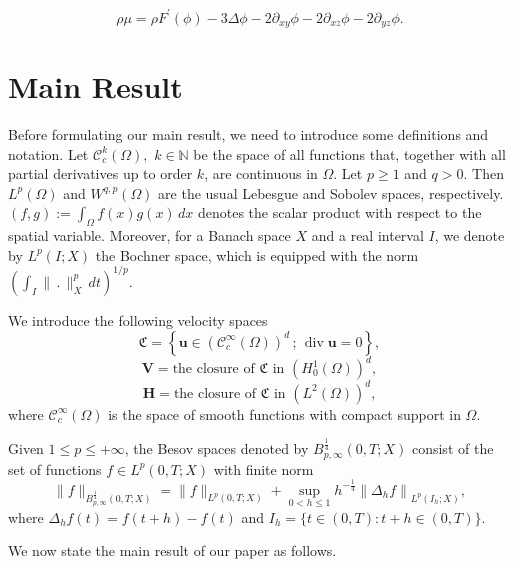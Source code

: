 \documentclass[11pt]{article}
\def\bq{\begin{equation}}
\def\eq{\end{equation}}
\def\bq{\begin{equation}}
\def\eq{\end{equation}}
\begin{document}
\bq\rho\mu = \rho F^{\prime}(\phi) - 3 \Delta \phi - 2 \partial_{xy}\phi - 2 \partial_{xz}\phi - 2 
\partial_{yz}\phi.\eq
















\section{Main Result}
Before formulating our main result, we need to introduce some definitions and notation. Let $\mathcal{C}_c^{k}(\Omega),\,\, k\in \mathbb{N}$ be the space of all functions that, together with all partial derivatives up to order $k$, are continuous in $\Omega$. Let $p \geq 1$ and $q > 0$. Then $L^p (\Omega)$ and $W^{q,p} (\Omega)$ are the usual Lebesgue and Sobolev spaces, respectively. $(f, g):= \int_{\Omega} f(x) g(x) \, dx$ denotes the scalar product with respect to the spatial variable. Moreover, for a Banach space $X$ and a real interval $I$, we
denote by $L^p(I; X)$ the Bochner space, which is equipped with the norm $\left(\int_I \|\,.\,\|_X^p \, dt \right)^{1/p}$.

We introduce the following velocity spaces $$\mathfrak{C}= \left\{\mathbf{u} \in \left(\mathcal{C}_c^{\infty}(\Omega)\right)^d \, ; \, \operatorname{div}\mathbf{u} = 0\right\},$$
$$\mathbf{V} = \text{the closure of } \mathfrak{C} \text{ in } \left(H^1_0(\Omega)\right)^d,$$
$$\mathbf{H} = \text{the closure of } \mathfrak{C} \text{ in } \left(L^2(\Omega)\right)^d,$$
where $\mathcal{C}_c^{\infty}(\Omega)$ is the space of smooth functions with compact support in $\Omega$. 

Given $1 \leq p \leq +\infty$, the Besov spaces denoted by $B_{p, \infty}^{\frac{1}{4}}(0,T ; X)$ consist of the set of functions $f \in L^p(0,T ; X)$ with finite norm
\begin{equation*}
\|f\|_{B_{p, \infty}^{\frac{1}{4}}(0,T ; X)} = \|f\|_{L^p(0,T ; X)} + \sup_{0<h \leq 1} h^{-\frac{1}{4}}\left\|\Delta_h f\right\|_{L^p\left(I_h ; X\right)},
\end{equation*}
where $\Delta_h f(t) = f(t+h) - f(t)$ and $I_h = \{t \in (0,T): t+h \in (0,T)\}$.

We now state the main result of our paper as follows.
\end{document}

